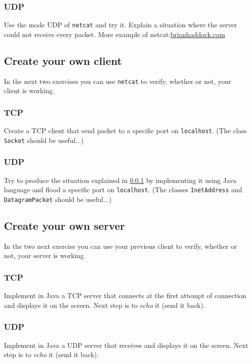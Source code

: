 \documentclass[11pt]{article}
\begin{document}
\subsubsection{UDP}\label{chat:udp}
Use the mode UDP of \verb"netcat" and try it. Explain a situation where the server could not receive every packet.
\newline
More example of netcat:\color{blue}\href{http://www.brianhaddock.com/2013/8-great-netcat-nc-unix-commands}{brianhaddock.com}\color{black}

\subsection{Create your own client}
In the next two exercises you can use \verb"netcat" to verify, whether or not, your client is working.
\subsubsection{TCP}
Create a TCP client that send packet to a specific port on \verb"localhost". (The class \verb"Socket" should be useful...)
\subsubsection{UDP}
Try to produce the situation explained in \ref{chat:udp} by implementing it using Java language and flood a specific port on \verb"localhost". (The classes \verb"InetAddress" and \verb"DatagramPacket" should be useful...)

\subsection{Create your own server}
In the two next exercise you can use your previous client to verify, whether or not, your server is working.
\subsubsection{TCP}
Implement in Java a TCP server that connects at the first attempt of connection and displays it on the screen. Next step is to \emph{echo} it (send it back).
\subsubsection{UDP}
Implement in Java a UDP server that receives and displays it on the screen. Next step is to \emph{echo} it (send it back).
\end{document}
